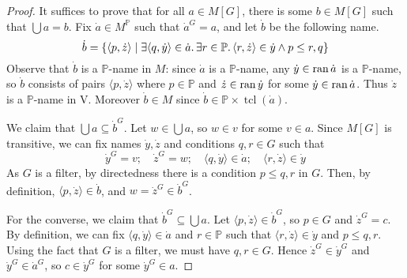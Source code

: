 \begin{proof}
    It suffices to prove that for all \( a \in M[G] \), there is some \( b \in M[G] \) such that \( \bigcup a = b \).
    Fix \( \dot a \in M^{\mathbb P} \) such that \( \dot a^G = a \), and let \( \dot b \) be the following name.
    \[ \dot b = \qty{\langle p, \dot z \rangle \mid \exists \langle q, \dot y \rangle \in \dot a.\, \exists r \in \mathbb P.\, \langle r, \dot z \rangle \in \dot y \wedge p \leq r, q} \]
    Observe that \( \dot b \) is a \( \mathbb P \)-name in \( M \): since \( \dot a \) is a \( \mathbb P \)-name, any \( \dot y \in \operatorname{ran} \dot a \) is a \( \mathbb P \)-name, so \( \dot b \) consists of pairs \( \langle p, \dot z \rangle \) where \( p \in \mathbb P \) and \( \dot z \in \operatorname{ran} \dot y \) for some \( \dot y \in \operatorname{ran} \dot a \).
    Thus \( \dot z \) is a \( \mathbb P \)-name in \( \mathrm{V} \).
    Moreover \( \dot b \in M \) since \( \dot b \in \mathbb P \times \operatorname{tcl}(\dot a) \).

    We claim that \( \bigcup a \subseteq \dot b^G \).
    Let \( w \in \bigcup a \), so \( w \in v \) for some \( v \in a \).
    Since \( M[G] \) is transitive, we can fix names \( \dot y, \dot z \) and conditions \( q, r \in G \) such that
    \[ \dot y^G = v;\quad \dot z^G = w;\quad \langle q, \dot y \rangle \in \dot a;\quad \langle r, \dot z \rangle \in \dot y \]
    As \( G \) is a filter, by directedness there is a condition \( p \leq q, r \) in \( G \).
    Then, by definition, \( \langle p, \dot z \rangle \in \dot b \), and \( w = \dot z^G \in \dot b^G \).

    For the converse, we claim that \( \dot b^G \subseteq \bigcup a \).
    Let \( \langle p, \dot z \rangle \in \dot b^G \), so \( p \in G \) and \( \dot z^G = c \).
    By definition, we can fix \( \langle q, \dot y \rangle \in \dot a \) and \( r \in \mathbb P \) such that \( \langle r, \dot z \rangle \in \dot y \) and \( p \leq q, r \).
    Using the fact that \( G \) is a filter, we must have \( q, r \in G \).
    Hence \( \dot z^G \in \dot y^G \) and \( \dot y^G \in \dot a^G \), so \( c \in \dot y^G \) for some \( \dot y^G \in a \).
\end{proof}
